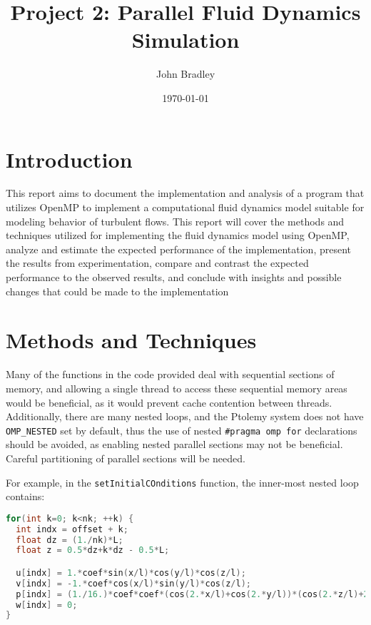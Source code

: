 \documentclass{article}
\title{Project 2: Parallel Fluid Dynamics Simulation}
\author{John Bradley}
\date{\today}
\begin{document}
  \maketitle

  \section{Introduction}

  This report aims to document the implementation and analysis of a program
  that utilizes OpenMP to implement a computational fluid dynamics model
  suitable for modeling behavior of turbulent flows. This report will cover the
  methods and techniques utilized for implementing the fluid dynamics model
  using OpenMP, analyze and estimate the expected performance of the 
  implementation, present the results from experimentation, compare and contrast 
  the expected performance to the observed results, and conclude with insights 
  and possible changes that could be made to the implementation
  
  \section{Methods and Techniques}

  Many of the functions in the code provided deal with sequential
  sections of memory, and allowing a single thread to access these sequential
  memory areas would be beneficial, as it would prevent cache contention
  between threads. Additionally, there are many nested loops, and the Ptolemy 
  system does not have \verb|OMP_NESTED| set by default, thus the use of nested
  \verb|#pragma omp for| declarations should be avoided, as enabling nested
  parallel sections may not be beneficial. Careful partitioning of parallel 
  sections will be needed.

  For example, in the \verb|setInitialCOnditions| function, the inner-most
  nested loop contains:

  \begin{lstlisting}[language=C, linewidth=0.9\textwidth, breaklines=true]
for(int k=0; k<nk; ++k) {
  int indx = offset + k;
  float dz = (1./nk)*L;
  float z = 0.5*dz+k*dz - 0.5*L;

  u[indx] = 1.*coef*sin(x/l)*cos(y/l)*cos(z/l);
  v[indx] = -1.*coef*cos(x/l)*sin(y/l)*cos(z/l);
  p[indx] = (1./16.)*coef*coef*(cos(2.*x/l)+cos(2.*y/l))*(cos(2.*z/l)+2.);
  w[indx] = 0;
}
  \end{lstlisting}
\end{document}
